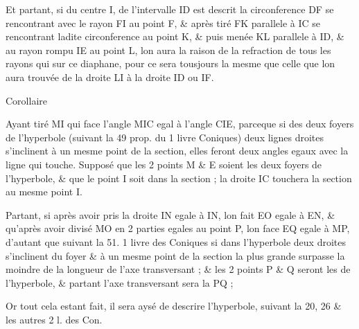 \documentclass[11pt,a4paper]{article}
\begin{document}
Et partant, si du centre I, de l'intervalle ID est descrit la circonference DF se rencontrant avec le rayon FI au point F, \& après tiré FK parallele à IC se rencontrant ladite circonference au point K, \& puis menée KL parallele à ID, \& au rayon rompu IE au point L, lon aura la raison de la refraction de tous les rayons qui   sur ce diaphane, pour ce  sera tousjours la mesme que celle que \struck{\ill{}} lon aura trouvée \struck{\ill{}} de la droite LI à la droite ID ou IF.

Corollaire

Ayant tiré MI qui face l'angle MIC egal à l'angle CIE, parceque si des deux foyers de l'hyperbole (suivant la 49 prop. du 1 livre  Coniques) deux lignes droites s'inclinent à un mesme point de la section, elles feront deux angles egaux avec la  ligne  qui touche. Supposé que \struck{\ill{}} les 2 points M \& E soient les deux foyers de l'hyperbole, \& que le point I soit dans la section ; la droite IC touchera la section au mesme point I.

Partant, si après avoir pris  la droite \struck{\ill{}} IN egale à IN, lon fait EO egale à EN, \& qu'après avoir divisé MO en 2 parties egales au point P, lon face EQ egale à MP, d'autant que suivant la 51.  1 livre des Coniques si dans l'hyperbole deux droites s'inclinent  du foyer \struck{\ill{}} \& à un mesme point de la section la plus grande surpasse la moindre de la longueur de l'axe transversant ; \& les 2 points P \& Q seront les   de l'hyperbole, \& partant l'axe transversant sera la   PQ ; \struck{\ill{}}

Or tout cela estant fait, il sera aysé de descrire \struck{\ill{}} l'hyperbole, suivant la 20, 26 \& les autres  2 l. des Con.
\end{document}

